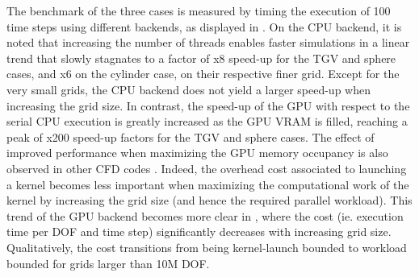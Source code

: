 \documentclass[10pt,a4paper]{article}
\begin{document}
The benchmark of the three cases is measured by timing the execution of 100 time steps using different backends, as displayed in . On the CPU backend, it is noted that increasing the number of threads enables faster simulations in a linear trend that slowly stagnates to a factor of x8 speed-up for the TGV and sphere cases, and x6 on the cylinder case, on their respective finer grid. Except for the very small grids, the CPU backend does not yield a larger speed-up when increasing the grid size. In contrast, the speed-up of the GPU with respect to the serial CPU execution is greatly increased as the GPU VRAM is filled, reaching a peak of x200 speed-up factors for the TGV and sphere cases. The effect of improved performance when maximizing the GPU memory occupancy is also observed in other CFD codes \citep{Kempf2024}. Indeed, the overhead cost associated to launching a kernel becomes less important when maximizing the computational work of the kernel by increasing the grid size (and hence the required parallel workload). This trend of the GPU backend becomes more clear in , where the cost (ie. execution time per DOF and time step) significantly decreases with increasing grid size. Qualitatively, the cost transitions from being kernel-launch bounded to workload bounded for grids larger than 10M DOF.
\end{document}
